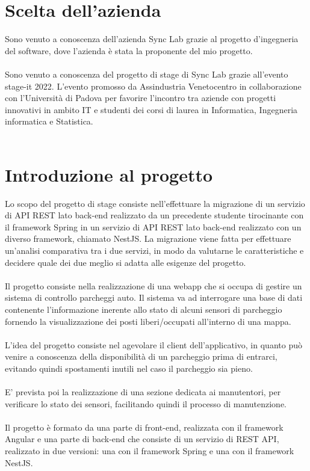 \section{Scelta dell'azienda}

Sono venuto a conoscenza dell'azienda Sync Lab grazie al progetto d'ingegneria del
software, dove l'azienda è stata la proponente del mio progetto.
\\\\
Sono venuto a conoscenza del progetto di stage di Sync Lab grazie all'evento stage-it 2022. 
L’evento promosso da Assindustria Venetocentro in collaborazione con l’Università 
di Padova per favorire l’incontro tra aziende con progetti innovativi in ambito IT e 
studenti dei corsi di laurea in Informatica, Ingegneria informatica e Statistica.
\\\\


\section{Introduzione al progetto}

Lo scopo del progetto di stage consiste nell'effettuare la migrazione di un servizio di
API REST lato back-end realizzato da un precedente studente tirocinante con il framework
Spring in un servizio di API REST lato back-end realizzato con un diverso framework, chiamato
NestJS. La migrazione viene fatta per effettuare un'analisi comparativa tra i due servizi, in
modo da valutarne le caratteristiche e decidere quale dei due meglio si adatta alle esigenze
del progetto.
\\\\
Il progetto consiste nella realizzazione di una webapp che si occupa di gestire un sistema
di controllo parcheggi auto. Il sistema va ad interrogare una base di dati contenente
l'informazione inerente allo stato di alcuni sensori di parcheggio fornendo la visualizzazione
dei posti liberi/occupati all'interno di una mappa.
\\\\
L'idea del progetto consiste nel agevolare il client dell'applicativo, in quanto può venire a 
conoscenza della disponibilità di un parcheggio prima di entrarci, evitando quindi
spostamenti inutili nel caso il parcheggio sia pieno.
\\\\
E' prevista poi la realizzazione di una sezione dedicata ai manutentori, per verificare lo 
stato dei sensori, facilitando quindi il processo di manutenzione.
\\\\
Il progetto è formato da una parte di front-end, realizzata con il framework Angular e una 
parte di back-end che consiste di un servizio di REST API, realizzato in due versioni: una 
con il framework Spring e una con il framework NestJS.

